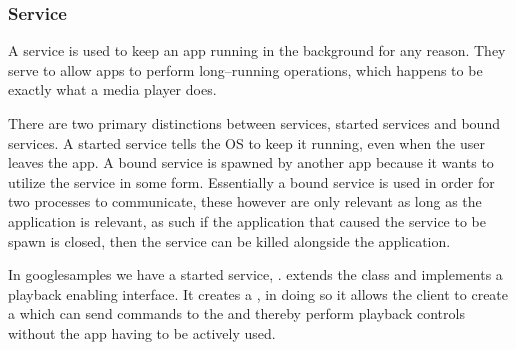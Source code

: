 \subsubsection{Service}
A service is used to keep an app running in the background for any reason.
They serve to allow apps to perform long--running operations, which happens to be exactly what a media player does.

There are two primary distinctions between services, started services and bound services.
A started service tells the OS to keep it running, even when the user leaves the app.
A bound service is spawned by another app because it wants to utilize the service in some form.
Essentially a bound service is used in order for two processes to communicate, these however are only relevant as long as the application is relevant, as such if the application that caused the service to be spawn is closed, then the service can be killed alongside the application.\cite{androidFundamentals}

In googlesamples we have a started service, .
 extends the  class and implements a playback enabling interface.
It creates a , in doing so it allows the client to create a  which can send commands to the  and thereby perform playback controls without the app having to be actively used.
